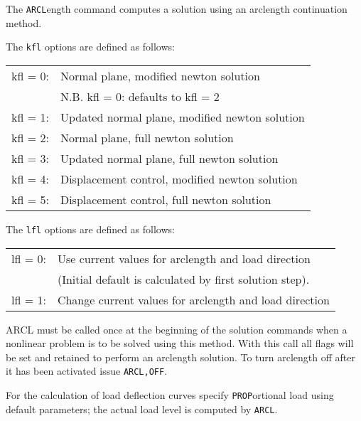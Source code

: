 \headb

The {\tt ARCL}ength command computes a solution using an arclength
continuation method.

The {\tt kfl} options are defined as follows:

\begin{center}
\begin{tabular}{l l }
kfl = 0:& Normal plane, modified newton solution \\
        & N.B. kfl = 0: defaults to kfl = 2 \\
kfl = 1:& Updated normal plane, modified newton solution \\
kfl = 2:& Normal plane, full newton solution \\
kfl = 3:& Updated normal plane, full newton solution \\
kfl = 4:& Displacement control, modified newton solution \\
kfl = 5:& Displacement control, full newton solution
\end{tabular}
\end{center}

The {\tt lfl} options are defined as follows:
\begin{center}
\begin{tabular}{l l }
lfl = 0:& Use current values for arclength and load direction \\
        & (Initial default is calculated by first solution step). \\
lfl = 1:& Change current values for arclength and load direction
\end{tabular}
\end{center}

ARCL must be called once at the beginning of the
solution commands when a nonlinear problem is to be
solved using this method.  With this call all flags will
be set and retained to perform an arclength solution.
To turn arclength off after it has been activated issue {\tt ARCL,OFF}.

For the calculation of load deflection curves
specify {\tt PROP}\-ortional
load using default parameters;
the actual load level is computed by {\tt ARCL}.

\vfill\eject
